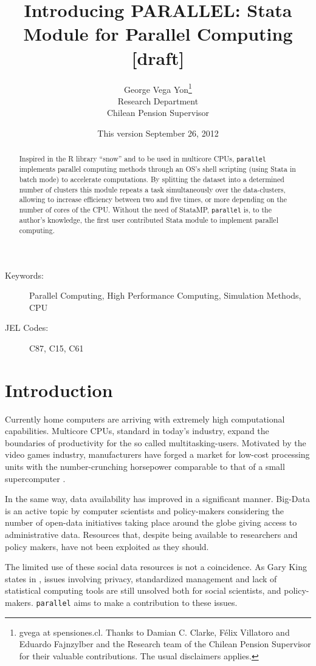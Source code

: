 \documentclass[letterpaper, 10pt]{article}
\author{George Vega Yon\thanks{gvega at spensiones.cl. Thanks to Damian C. Clarke, F\'elix Villatoro and Eduardo Fajnzylber and the Research team of the Chilean Pension Supervisor for their valuable contributions. The usual disclaimers applies.}\\Research Department\\Chilean Pension Supervisor}
\title{Introducing PARALLEL: Stata Module for Parallel Computing [draft]}
\date{This version September 26, 2012}
\begin{document}
\maketitle

\begin{abstract}
Inspired in the R library ``snow'' and to be used in multicore CPUs, {\tt parallel}
implements parallel computing methods through an OS's shell scripting (using
Stata in batch mode) to accelerate computations. By splitting the dataset into
a determined number of clusters this module repeats a task simultaneously over
the data-clusters, allowing to increase efficiency between two and five times,
or more depending on the number of cores of the CPU. Without the need of StataMP,
{\tt parallel} is, to the author's knowledge, the first user contributed Stata
module to implement parallel computing.
\end{abstract}

{\footnotesize 
\begin{description}
\item[Keywords:] Parallel Computing, High Performance Computing, Simulation Methods, CPU
\item[JEL Codes:] C87, C15, C61
\end{description}
}

\clearpage

\section{Introduction}

Currently home computers are arriving with extremely high computational capabilities. Multicore CPUs, standard in today's industry, expand the boundaries of productivity for the so called multitasking-users. Motivated by the video games industry, manufacturers have forged a market for low-cost processing units with the number-crunching horsepower comparable to that of a small supercomputer \cite{aldrich2011}.

In the same way, data availability has improved in a significant manner. Big-Data is an active topic by computer scientists and policy-makers considering the number of open-data initiatives taking place around the globe giving access to administrative data. Resources that, despite being available to researchers and policy makers, have not been exploited as they should.

The limited use of these social data resources is not a coincidence. As Gary King states in , issues involving privacy, standardized management and lack of statistical computing tools are still unsolved both for social scientists, and policy-makers. {\tt parallel} aims to make a contribution to these issues.
\end{document}
